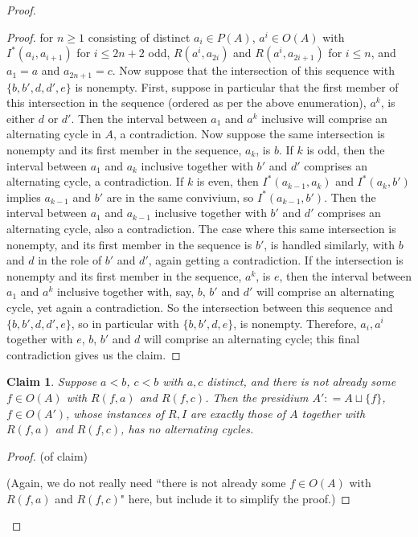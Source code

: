 \documentclass{amsart}
\newtheorem{claim}[theorem]{Claim}
\theoremstyle{definition}
\theoremstyle{remark}
\numberwithin{equation}{section}
\begin{document}
\begin{proof}
\begin{proof}
for $n \geq 1$ consisting of distinct $a_i \in P(A)$, $a^i \in O(A)$ with $I^{*}(a_i, a_{i+1})$ for $i \leq 2n+2$ odd, $R(a^i, a_{2i})$ and $R(a^i, a_{2i+1})$ for $i \leq n$,  and $a_1 = a$ and $a_{2n+1} = c$. Now suppose that the intersection of this sequence with $\{b, b', d, d', e\}$ is nonempty. First, suppose in particular that the first member of this intersection in the sequence (ordered as per the above enumeration), $a^k$, is either $d$ or $d'$. Then the interval between $a_1$ and $a^k$ inclusive will comprise an alternating cycle in $A$, a contradiction. Now suppose the same intersection is nonempty and its first member in the sequence, $a_k$, is $b$. If $k$ is odd, then the interval between $a_1$ and $a_k$ inclusive together with $b'$ and $d'$ comprises an alternating cycle, a contradiction. If $k$ is even, then $I^{*}(a_{k-1}, a_{k})$ and $I^{*}(a_k, b')$ implies $a_{k-1}$ and $b'$ are in the same convivium, so $I^{*}(a_{k-1}, b')$. Then the interval between $a_{1}$ and $a_{k-1}$ inclusive together with $b'$ and $d'$ comprises an alternating cycle, also a contradiction. The case where this same intersection is nonempty, and its first member in the sequence is $b'$, is handled similarly, with $b$ and $d$ in the role of $b'$ and $d'$, again getting a contradiction. If the intersection is nonempty and its first member in the sequence, $a^{k}$, is $e$, then the interval between $a_1$ and $a^{k}$ inclusive together with, say, $b$, $b'$ and $d'$ will comprise an alternating cycle, yet again a contradiction. So the intersection between this sequence and $\{b, b', d, d', e\}$, so in particular with $\{b,b',  d, e\}$, is nonempty. Therefore,  $a_i, a^{i}$ together with $e$, $b$, $b'$ and $d$ will comprise an alternating cycle; this final contradiction gives us the claim.

    
\end{proof}


\begin{claim}
    \label{order construction 3} Suppose $a < b$, $c < b$ with $a, c$ distinct, and there is not already some $f\in O(A)$ with $R(f, a)$ and $R(f, c)$. Then the presidium $A' : = A \sqcup \{f\}$, $f \in O(A')$, whose instances of $R, I$ are exactly those of $A$ together with $R(f, a)$ and $R(f, c)$, has no alternating cycles.
\end{claim}

\begin{proof}
    (of claim)

    (Again, we do not really need ``there is not already some $f\in O(A)$ with $R(f, a)$ and $R(f, c)$" here, but include it to simplify the proof.) 


\end{proof}
\end{proof}
\end{document}
